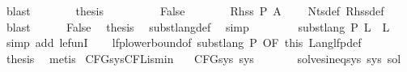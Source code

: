 \begin{isabellebody}
\ blast\isanewline
\ \ \ \ \isamarkupfalse%
\ \isamarkupfalse%
\ {\isacharquery}{\kern0pt}thesis\ \isakeywordONE{{\isachardot}{\kern0pt}}\isamarkupfalse%
\isanewline
\ \ \isamarkupfalse%
\isanewline
\ \ \ \ \isamarkupfalse%
\ False\isanewline
\ \ \ \ \isamarkupfalse%
\ \isamarkupfalse%
\ {\isachardoublequoteopen}Rhss\ P\ A\ {\isacharequal}{\kern0pt}\ {\isacharbraceleft}{\kern0pt}{\isacharbraceright}{\kern0pt}{\isachardoublequoteclose}\ \isamarkupfalse%
\ Nts{\isacharunderscore}{\kern0pt}def\ Rhss{\isacharunderscore}{\kern0pt}def\ \isamarkupfalse%
\ blast\isanewline
\ \ \ \ \isamarkupfalse%
\ False\ \isamarkupfalse%
\ {\isacharquery}{\kern0pt}thesis\ \isamarkupfalse%
\ subst{\isacharunderscore}{\kern0pt}lang{\isacharunderscore}{\kern0pt}def\ \isamarkupfalse%
\ simp\isanewline
\ \ \isamarkupfalse%
\isanewline
\ \ \isamarkupfalse%
\ \isamarkupfalse%
\ {\isachardoublequoteopen}subst{\isacharunderscore}{\kern0pt}lang\ P\ {\isacharquery}{\kern0pt}L{\isacharprime}{\kern0pt}\ {\isasymle}\ {\isacharquery}{\kern0pt}L{\isacharprime}{\kern0pt}{\isachardoublequoteclose}\ \isamarkupfalse%
\ {\isacharparenleft}{\kern0pt}simp\ add{\isacharcolon}{\kern0pt}\ le{\isacharunderscore}{\kern0pt}funI{\isacharparenright}{\kern0pt}\isanewline
\ \ \isamarkupfalse%
\ lfp{\isacharunderscore}{\kern0pt}lowerbound{\isacharbrackleft}{\kern0pt}of\ {\isachardoublequoteopen}subst{\isacharunderscore}{\kern0pt}lang\ P{\isachardoublequoteclose}{\isacharcomma}{\kern0pt}\ OF\ this{\isacharbrackright}{\kern0pt}\ Lang{\isacharunderscore}{\kern0pt}lfp{\isacharunderscore}{\kern0pt}def\ \isamarkupfalse%
\ {\isacharquery}{\kern0pt}thesis\ \isamarkupfalse%
\ metis\isanewline
{}\isamarkupfalse%
%
\endisatagproof
{\isafoldproof}%
%
\isadelimproof
\isanewline
%
\endisadelimproof
\isanewline
{}\isamarkupfalse%
\ CFG{\isacharunderscore}{\kern0pt}sys{\isacharunderscore}{\kern0pt}CFL{\isacharunderscore}{\kern0pt}is{\isacharunderscore}{\kern0pt}min{\isacharcolon}{\kern0pt}\isanewline
\ \ \ {\isachardoublequoteopen}CFG{\isacharunderscore}{\kern0pt}sys\ sys{\isachardoublequoteclose}\isanewline
\ \ \ \ \ \ \ {\isachardoublequoteopen}solves{\isacharunderscore}{\kern0pt}ineq{\isacharunderscore}{\kern0pt}sys\ sys\ sol{\isacharprime}{\kern0pt}{\isachardoublequoteclose}\isanewline

\end{isabellebody}
